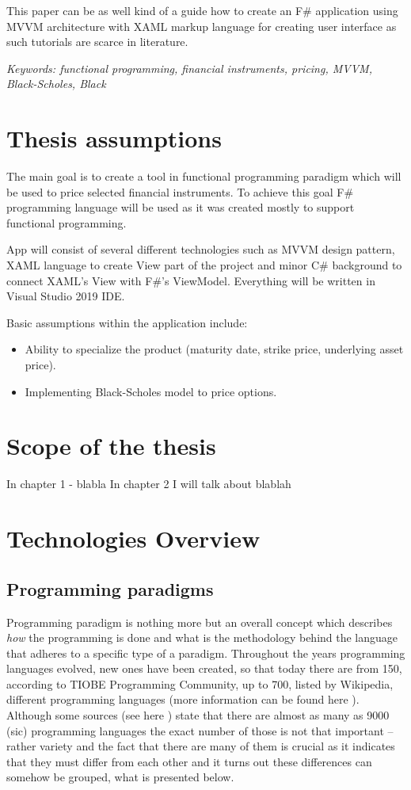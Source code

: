     This paper can be as well kind of a guide how to create an F\# application using MVVM architecture with XAML markup language for creating user interface as such tutorials are scarce in literature.
    
    \emph{Keywords: functional programming, financial instruments, pricing, MVVM, Black-Scholes, Black}

\section{Thesis assumptions}
    The main goal is to create a tool in functional programming paradigm which will be used to price selected financial instruments. To achieve this goal F\# programming language will be used as it was created mostly to support functional programming.
    
    App will consist of several different technologies such as MVVM design pattern, XAML language to create View part of the project and minor C\# background to connect XAML's View with F\#'s ViewModel. Everything will be written in Visual Studio 2019 IDE.
    
    Basic assumptions within the application include:
    \begin{itemize}
    \item Ability to specialize the product (maturity date, strike price, underlying asset price).
    \item Implementing Black-Scholes model to price options.
    \end{itemize}

\section{Scope of the thesis}
    In chapter 1 - blabla
    In chapter 2 I will talk about blablah

\section{Technologies Overview}
\subsection{Programming paradigms}
    Programming paradigm is nothing more but an overall concept which describes \textit{how} the programming is done and what is the methodology behind the language that adheres to a specific type of a paradigm. Throughout the years programming languages evolved, new ones have been created, so that today there are from 150, according to TIOBE Programming Community, up to 700, listed by Wikipedia, different programming languages (more information can be found here \cite{numberOfProgrammingLanguages}). Although some sources (see here \cite{numberOfProgrammingLanguages_hopl_info}) state that there are almost as many as 9000 (sic) programming languages the exact number of those is not that important -- rather variety and the fact that there are many of them is crucial as it indicates that they must differ from each other and it turns out these differences can somehow be grouped, what is presented below.
    
